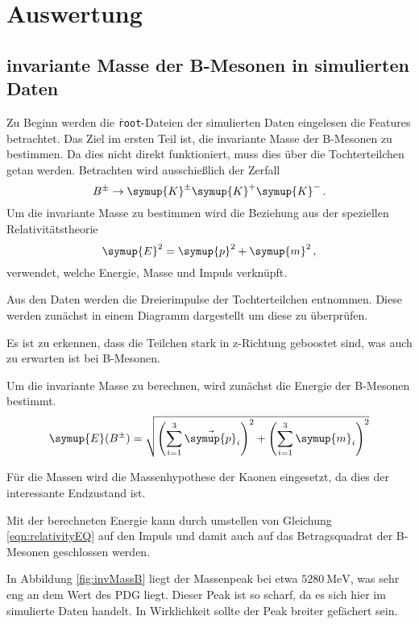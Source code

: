 \section{Auswertung}
\label{sec:auswertung}
\subsection{invariante Masse der B-Mesonen in simulierten Daten}

Zu Beginn werden die \texttt{\.root}-Dateien der simulierten Daten eingelesen die Features betrachtet.
Das Ziel im ersten Teil ist, die invariante Masse der B-Mesonen zu bestimmen. Da dies nicht direkt funktioniert, muss dies \"uber die Tochterteilchen getan werden.
Betrachten wird ausschie\ss lich der Zerfall
\begin{equation}
  B^{\pm} \to \symup{K}^{\pm} \symup{K}^{+} \symup{K}^{-}\,.
\end{equation}
Um die invariante Masse zu bestimmen wird die Beziehung aus der speziellen Relativit\"atstheorie
\begin{equation}
  \symup{E}^2 = \symup{p}^2 + \symup{m}^2\,,
  \label{eqn:relativityEQ}
\end{equation}
verwendet, welche Energie, Masse und Impuls verkn\"upft.

Aus den Daten werden die Dreierimpulse der Tochterteilchen entnommen.
Diese werden zunächst in einem Diagramm dargestellt um diese zu überprüfen.


Es ist zu erkennen, dass die Teilchen stark in z-Richtung geboostet sind, was auch zu erwarten ist bei B-Mesonen.

Um die invariante Masse zu berechnen, wird zun\"achst die Energie der B-Mesonen bestimmt.
\begin{equation}
  \symup{E}(B^{\pm}) =
  \sqrt{\left(\sum_{i = 1}^{3} \vec{\symup{p}}_i\right)^2 + \left(\sum_{i = 1}^{3} \symup{m}_i\right)^2}
\end{equation}

F\"ur die Massen wird die Massenhypothese der Kaonen eingesetzt, da dies der interessante Endzustand ist.

Mit der berechneten Energie kann durch umstellen von Gleichung \eqref{eqn:relativityEQ} auf den Impuls und damit auch auf das Betragsquadrat der B-Mesonen geschlossen werden.

In Abbildung \ref{fig:invMassB} liegt der Massenpeak bei etwa $\SI{5280}{\mega\electronvolt}$, was sehr eng an dem Wert des PDG liegt.
Dieser Peak ist so scharf, da es sich hier im simulierte Daten handelt. In Wirklichkeit sollte der Peak breiter gefächert sein.

